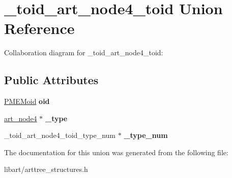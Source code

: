 \hypertarget{union__toid__art__node4__toid}{}\section{\+\_\+toid\+\_\+art\+\_\+node4\+\_\+toid Union Reference}
\label{union__toid__art__node4__toid}


Collaboration diagram for \+\_\+toid\+\_\+art\+\_\+node4\+\_\+toid\+:
\subsection*{Public Attributes}
\begin{DoxyCompactItemize}
\item 
\mbox{\label{union__toid__art__node4__toid_ac67b41cac00f0dab21789fbc0327239a}} 
\hyperlink{structpmemoid}{P\+M\+E\+Moid} {\bfseries oid}
\item 
\mbox{\label{union__toid__art__node4__toid_ab874dc090bde73feec5a4598f2638904}} 
\hyperlink{struct__art__node4}{art\+\_\+node4} $\ast$ {\bfseries \+\_\+type}
\item 
\mbox{\label{union__toid__art__node4__toid_a5b560202123e55019ebc6cf73a4a18fe}} 
\+\_\+toid\+\_\+art\+\_\+node4\+\_\+toid\+\_\+type\+\_\+num $\ast$ {\bfseries \+\_\+type\+\_\+num}
\end{DoxyCompactItemize}


The documentation for this union was generated from the following file\+:\begin{DoxyCompactItemize}
\item 
libart/arttree\+\_\+structures.\+h\end{DoxyCompactItemize}

